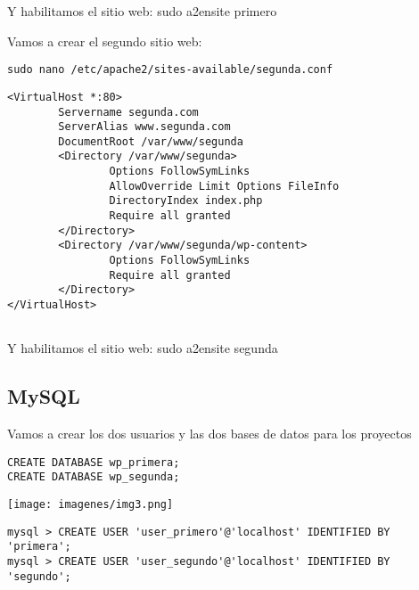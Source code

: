\documentclass{article}
\begin{document}
\begin{flushleft}
Y habilitamos el sitio web: sudo a2ensite primero
\end{flushleft}
 
\begin{flushleft}
Vamos a crear el segundo sitio web: 
\end{flushleft}

\begin{lstlisting}[frame=single]
sudo nano /etc/apache2/sites-available/segunda.conf
\end{lstlisting}


\begin{lstlisting}[frame=single]
<VirtualHost *:80>
        Servername segunda.com
        ServerAlias www.segunda.com
        DocumentRoot /var/www/segunda
        <Directory /var/www/segunda>
                Options FollowSymLinks
                AllowOverride Limit Options FileInfo
                DirectoryIndex index.php
                Require all granted
        </Directory>
        <Directory /var/www/segunda/wp-content>
                Options FollowSymLinks
                Require all granted
        </Directory>
</VirtualHost>


\end{lstlisting}

\begin{flushleft}
Y habilitamos el sitio web: sudo a2ensite segunda
\end{flushleft}


\subsection{MySQL}
 \begin{flushleft}
 Vamos a crear los dos usuarios y las dos bases de datos para los proyectos
 \end{flushleft}
 
 
\lstset{language=C, breaklines=true, basicstyle=\footnotesize}
\begin{lstlisting}[frame=single]
CREATE DATABASE wp_primera;
CREATE DATABASE wp_segunda;
\end{lstlisting}

\begin{center}
\texttt{[image: imagenes/img3.png]} 
\end{center}


\begin{lstlisting}[frame=single]
mysql > CREATE USER 'user_primero'@'localhost' IDENTIFIED BY 'primera';
mysql > CREATE USER 'user_segundo'@'localhost' IDENTIFIED BY 'segundo';
 

\end{lstlisting}
\end{document}
